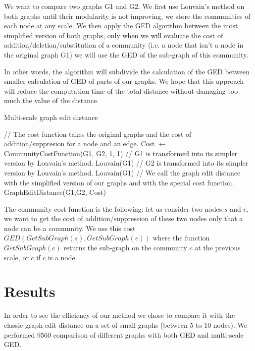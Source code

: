 \documentclass[UTF8, twoside]{EPURapport}
\begin{document}
	\hspace{4ex}We want to compare two graphs G1 and G2. We first use Louvain's method on both graphs until their modularity is not improving, we store the communities of each node at any scale. We then apply the GED algorithm between the most simplified version of both graphs, only when we will evaluate the cost of addition/deletion/substitution of a community (i.e. a node that isn't a node in the original graph G1) we will use the GED of the sub-graph of this community.
	
	In other words, the algorithm will subdivide the calculation of the GED between smaller calculation of GED of parts of our graphs. We hope that this approach will reduce the computation time of the total distance without damaging too much the value of the distance. 
\\

\begin{algorithm}
	\caption{Multi-scale graph edit distance}
	\begin{algorithmic}[1]
		\State // The cost function takes the original graphs and the cost of addition/suppresion for a node and an edge.
		\State Cost $\gets$ CommunityCostFunction(G1, G2, 1, 1)
		\State // G1 is transformed into its simpler version by Louvain's method.
		\State Louvain(G1)
		\State // G2 is transformed into its simpler version by Louvain's method.
		\State Louvain(G1)
		\State // We call the graph edit distance with the simplified version of our graphs and with the special cost function.
		\State \Return GraphEditDistance(G1,G2, Cost)
	\end{algorithmic}
\end{algorithm}

	The community cost function is the following: let us consider two nodes $s$ and $e$, we want to get the cost of addition/suppression of these two nodes only that a node can be a community. We use this cost $GED(GetSubGraph(s),GetSubGraph(e))$ where the function $GetSubGraph(c)$ returns the sub-graph on the community $c$ at the previous scale, or $c$ if $c$ is a node.
	
\chapter{Results}

	\hspace{4ex}In order to see the efficiency of our method we chose to compare it with the classic graph edit distance on a set of small graphs (between 5 to 10 nodes). We performed 9560 comparison of different graphs with both GED and multi-scale GED.
	
\end{document}
